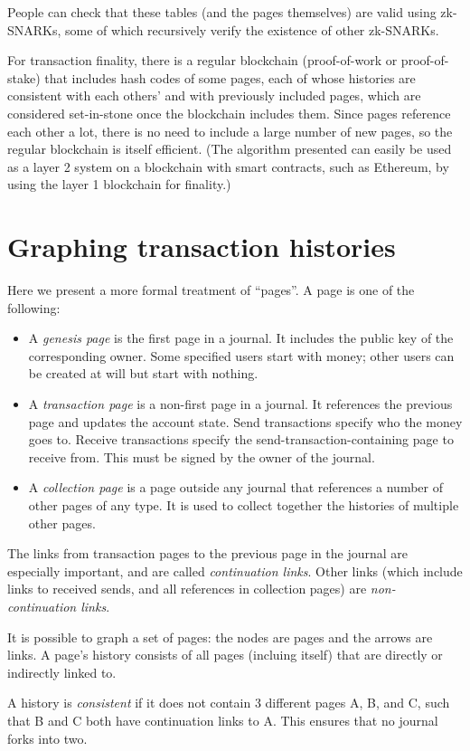 \documentclass{article}
\begin{document}
People can check that these tables (and the pages themselves) are valid using zk-SNARKs, some of which recursively verify the existence of other zk-SNARKs.

For transaction finality, there is a regular blockchain (proof-of-work or proof-of-stake) that includes hash codes of some pages, each of whose histories are consistent with each others' and with previously included pages, which are considered set-in-stone once the blockchain includes them.  Since pages reference each other a lot, there is no need to include a large number of new pages, so the regular blockchain is itself efficient.  (The algorithm presented can easily be used as a layer 2 system on a blockchain with smart contracts, such as Ethereum, by using the layer 1 blockchain for finality.)

\section{Graphing transaction histories}

Here we present a more formal treatment of ``pages''.  A page is one of the following:

\begin{itemize}
  \item A \emph{genesis page} is the first page in a journal.  It includes the public key of the corresponding owner.  Some specified users start with money; other users can be created at will but start with nothing.
  \item A \emph{transaction page} is a non-first page in a journal.  It references the previous page and updates the account state.  Send transactions specify who the money goes to.  Receive transactions specify the send-transaction-containing page to receive from.  This must be signed by the owner of the journal.
  \item A \emph{collection page} is a page outside any journal that references a number of other pages of any type.  It is used to collect together the histories of multiple other pages.
\end{itemize}

The links from transaction pages to the previous page in the journal are especially important, and are called \emph{continuation links}.  Other links (which include links to received sends, and all references in collection pages) are \emph{non-continuation links}.

It is possible to graph a set of pages: the nodes are pages and the arrows are links.  A page's history consists of all pages (incluing itself) that are directly or indirectly linked to.

A history is \emph{consistent} if it does not contain 3 different pages A, B, and C, such that B and C both have continuation links to A.  This ensures that no journal forks into two.
\end{document}
